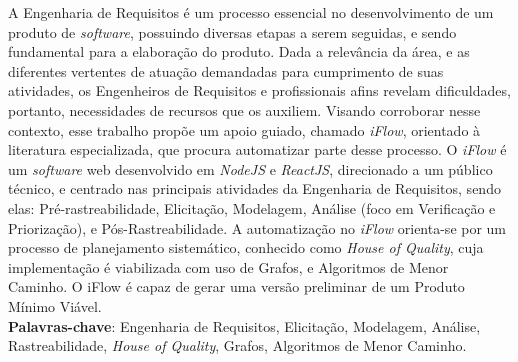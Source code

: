 \begin{resumo}
    A Engenharia de Requisitos é um processo essencial no desenvolvimento de um produto de \textit{software}, possuindo diversas etapas a serem seguidas, e sendo fundamental para a elaboração do produto. Dada a relevância da área, e as diferentes vertentes de atuação demandadas para cumprimento de suas atividades, os Engenheiros de Requisitos e profissionais afins revelam dificuldades, portanto, necessidades de recursos que os auxiliem. Visando corroborar nesse contexto, esse trabalho propõe um apoio guiado, chamado \textit{iFlow}, orientado à literatura especializada, que procura automatizar parte desse processo. O \textit{iFlow} é um \textit{software} web desenvolvido em \textit{NodeJS} e \textit{ReactJS}, direcionado a um público técnico, e centrado nas principais atividades da Engenharia de Requisitos, sendo elas: Pré-rastreabilidade, Elicitação, Modelagem, Análise (foco em Verificação e Priorização), e Pós-Rastreabilidade. A automatização no \textit{iFlow} orienta-se por um processo de planejamento sistemático, conhecido como \textit{House of Quality}, cuja implementação é viabilizada com uso de Grafos, e Algoritmos de Menor Caminho. O iFlow é capaz de gerar uma versão preliminar de um Produto Mínimo Viável.
    \vspace{\onelineskip}
    \noindent
    \\
    \textbf{Palavras-chave}: Engenharia de Requisitos, Elicitação, Modelagem, Análise, Rastreabilidade, \textit{House of Quality}, Grafos, Algoritmos de Menor Caminho.
\end{resumo}
